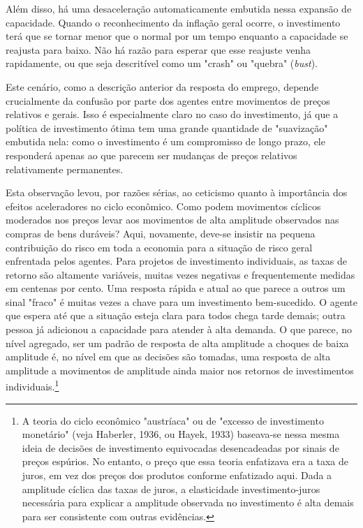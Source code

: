 \documentclass[12pt]{article}
\begin{document}
Além disso, há uma desaceleração automaticamente embutida nessa expansão de capacidade. Quando o reconhecimento da inflação geral ocorre, o investimento terá que se tornar menor que o normal por um tempo enquanto a capacidade se reajusta para baixo. Não há razão para esperar que esse reajuste venha rapidamente, ou que seja descritível como um "crash" ou "quebra" (\textit{bust}).

Este cenário, como a descrição anterior da resposta do emprego, depende crucialmente da confusão por parte dos agentes entre movimentos de preços relativos e gerais. Isso é especialmente claro no caso do investimento, já que a política de investimento ótima tem uma grande quantidade de "suavização" embutida nela: como o investimento é um compromisso de longo prazo, ele responderá apenas ao que parecem ser mudanças de preços relativos relativamente permanentes.

Esta observação levou, por razões sérias, ao ceticismo quanto à importância dos efeitos aceleradores no ciclo econômico. Como podem movimentos cíclicos moderados nos preços levar aos movimentos de alta amplitude observados nas compras de bens duráveis? Aqui, novamente, deve-se insistir na pequena contribuição do risco em toda a economia para a situação de risco geral enfrentada pelos agentes. Para projetos de investimento individuais, as taxas de retorno são altamente variáveis, muitas vezes negativas e frequentemente medidas em centenas por cento. Uma resposta rápida e atual ao que parece a outros um sinal "fraco" é muitas vezes a chave para um investimento bem-sucedido. O agente que espera até que a situação esteja clara para todos chega tarde demais; outra pessoa já adicionou a capacidade para atender à alta demanda. O que parece, no nível agregado, ser um padrão de resposta de alta amplitude a choques de baixa amplitude é, no nível em que as decisões são tomadas, uma resposta de alta amplitude a movimentos de amplitude ainda maior nos retornos de investimentos individuais.\footnote{A teoria do ciclo econômico "austríaca" ou de "excesso de investimento monetário" (veja Haberler, 1936, ou Hayek, 1933) baseava-se nessa mesma ideia de decisões de investimento equivocadas desencadeadas por sinais de preços espúrios. No entanto, o preço que essa teoria enfatizava era a taxa de juros, em vez dos preços dos produtos conforme enfatizado aqui. Dada a amplitude cíclica das taxas de juros, a elasticidade investimento-juros necessária para explicar a amplitude observada no investimento é alta demais para ser consistente com outras evidências.}
\end{document}
